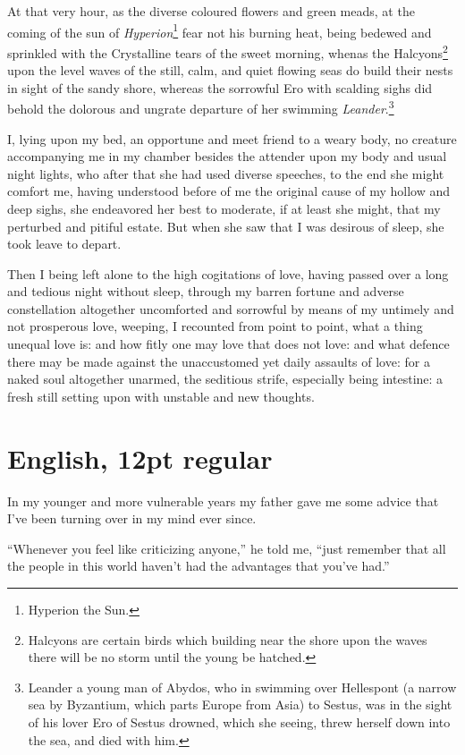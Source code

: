 \documentclass[12pt]{book}
\begin{document}
At that very hour, as the diverse coloured flowers and green meads,
at the coming of the sun of \textit{Hyperion}\footnote{Hyperion the Sun.}
fear not his burning heat, being bedewed and sprinkled with the
Crystalline tears of the sweet morning, whenas the
Halcyons\footnote{Halcyons are certain birds which building near the
  shore upon the waves there will be no storm until the young be
  hatched.} upon the level waves of the still, calm, and quiet
flowing seas do build their nests in sight of the sandy shore,
whereas the sorrowful Ero with scalding sighs did behold the
dolorous and ungrate departure of her swimming
\textit{Leander}.\footnote{Leander a young man of Abydos, who in swimming over
  Hellespont (a narrow sea by Byzantium, which parts Europe from Asia)
  to Sestus, was in the sight of his lover Ero of Sestus drowned,
  which she seeing, threw herself down into the sea, and died with
  him.}

I, lying upon my bed, an opportune and meet friend to a weary body, no
creature accompanying me in my chamber besides the attender upon my
body and usual night lights, who after that she had used diverse
speeches, to the end she might comfort me, having understood before
of me the original cause of my hollow and deep sighs, she
endeavored her best to moderate, if at least she might, that my
perturbed and pitiful estate. But when she saw that I was desirous
of sleep, she took leave to depart.

Then I being left alone to the high cogitations of love, having passed
over a long and tedious night without sleep, through my barren
fortune and adverse constellation altogether uncomforted and
sorrowful by means of my untimely and not prosperous love, weeping,
I recounted from point to point, what a thing unequal love is: and
how fitly one may love that does not love: and what defence there may
be made against the unaccustomed yet daily assaults of love: for a
naked soul altogether unarmed, the seditious strife, especially being
intestine: a fresh still setting upon with unstable and new
thoughts.\pagebreak

\section*{English, 12pt regular}

In my younger and more vulnerable years my father gave me some advice
that I’ve been turning over in my mind ever since.

“Whenever you feel like criticizing anyone,” he told me, “just
remember that all the people in this world haven’t had the advantages
that you’ve had.”
\end{document}
